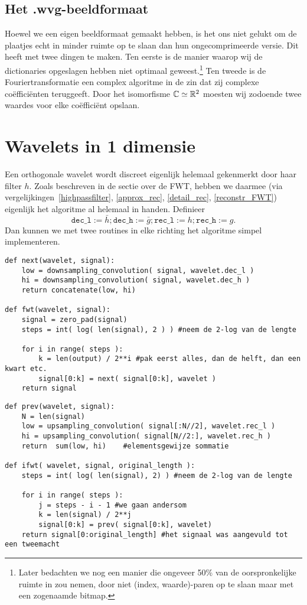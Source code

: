 \subsection{Het .wvg-beeldformaat}
Hoewel we een eigen beeldformaat gemaakt hebben, is het ons niet gelukt om de plaatjes echt in minder ruimte op te slaan dan hun ongecomprimeerde versie. Dit heeft met twee dingen te maken. Ten eerste is de manier waarop wij de dictionaries opgeslagen hebben niet optimaal geweest.\footnote{Later bedachten we nog een manier die ongeveer 50\% van de oorspronkelijke ruimte in zou nemen, door niet (index, waarde)-paren op te slaan maar met een zogenaamde bitmap.} Ten tweede is de Fouriertransformatie een complex algoritme in de zin dat zij complexe co\"effici\"enten teruggeeft. Door het isomorfisme $\mathbb{C} \simeq \mathbb{R}^2$ moesten wij zodoende twee waardes voor elke co\"effici\"ent opslaan.

\section{Wavelets in 1 dimensie}
Een orthogonale wavelet wordt discreet eigenlijk helemaal gekenmerkt door haar filter $h$. Zoals beschreven in de sectie over de FWT, hebben we daarmee (via vergelijkingen~\ref{highpassfilter}, \ref{approx_rec}, \ref{detail_rec}, \ref{reconstr_FWT}) eigenlijk het algoritme al helemaal in handen. Definieer
\[
	\texttt{dec\_l} := \bar{h}; \texttt{dec\_h} := \bar{g}; \texttt{rec\_l} := h; \texttt{rec\_h} := g.
\]
Dan kunnen we met twee routines in elke richting het algoritme simpel implementeren.
\begin{lstlisting}[caption=De FWT]
def next(wavelet, signal):
	low = downsampling_convolution( signal, wavelet.dec_l )
	hi = downsampling_convolution( signal, wavelet.dec_h )
	return concatenate(low, hi)
	
def fwt(wavelet, signal):
	signal = zero_pad(signal)
	steps = int( log( len(signal), 2 ) ) #neem de 2-log van de lengte
	
	for i in range( steps ):
		k = len(output) / 2**i #pak eerst alles, dan de helft, dan een kwart etc.
		signal[0:k] = next( signal[0:k], wavelet )
	return signal
\end{lstlisting}
\begin{lstlisting}[caption=De iFWT]
def prev(wavelet, signal):
	N = len(signal)
	low = upsampling_convolution( signal[:N//2], wavelet.rec_l )
	hi = upsampling_convolution( signal[N//2:], wavelet.rec_h )
	return  sum(low, hi) 	#elementsgewijze sommatie
	
def ifwt( wavelet, signal, original_length ):
	steps = int( log( len(signal), 2) ) #neem de 2-log van de lengte
	
	for i in range( steps ):
		j = steps - i - 1 #we gaan andersom
		k = len(signal) / 2**j
		signal[0:k] = prev( signal[0:k], wavelet)
	return signal[0:original_length] #het signaal was aangevuld tot een tweemacht

\end{lstlisting}

